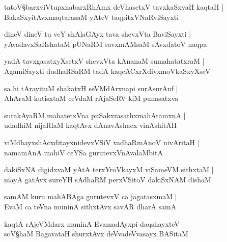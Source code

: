 \begin{shloka}
tatoV\S barxviVtupxnabarxRhAmx deVhasetxV tavxkaSxyaH kaqtaH |\\
BakaSxyitAvxmaqtarasaM yAteV taqpitxVNaRviSayxti
\end{shloka}

\begin{shloka}
dineV dineV tu veY shAlaGAyx tava shevxVta BaviSayxti |\\
yAvadavxSaRshataM pUNaRM savxmAMsaM sAvxdatoV naqpa
\end{shloka}

\begin{shloka}
yadA tavxgasatxyXsetxV shevxVta kAnanaM sumahatatxraM |\\
AgamiSayxti dudhaRSaRM tadA kaqcACxrXdivxmoVkaSxyXseV 
\end{shloka}

\begin{shloka}
sa hi tArayituM shakatxH seVMdArxnapi surAsurAnf |\\
AhAraM kutisxtaM ceVdaM rAjaSeRV kiM punasatxva 
\end{shloka}

\begin{shloka}
surakAyaRM mahatetxVna puSakxrasathxmahAtamxnA |\\
udadhiM nijaRlaM kaqtAvx dAnavAshacx vinAshitAH 
\end{shloka}

\begin{shloka}
viMdhayxshAcxditayxnidevxVSiV vadhaRmAnoV nivAritaH |\\
namamAnA mahiV ceYSa gurutevxVnAvalaMbitA
\end{shloka}

\begin{shloka}
dakiSxNA digidxvaM yAtA terxYroVkayxM viSameVM sithxtaM |\\
mayA gatAvx sureYH sAdhaRM perxVSitoV dakiSxNAM dishaM 
\end{shloka}

\begin{shloka}
samAM kuru mahABAga gurutevxV ca jagatasxmaM |\\
EvaM ca teVna muninA sithxtAvx savAR dharA samA 
\end{shloka}

\begin{shloka}
kaqtA rAjeVMdarx muninA EvamadAyxpi daqshayxteV |\\
soV\S haM BagavataH shurxtAvx deVvadeVvasayx BASitaM 
\end{shloka}

